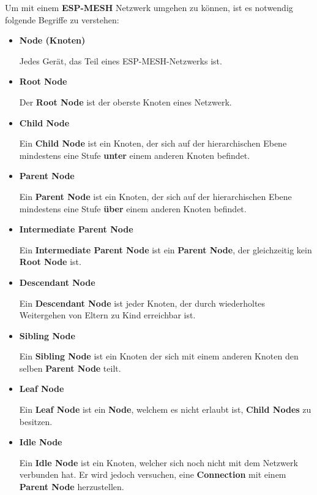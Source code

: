 Um mit einem \textbf{ESP-MESH} Netzwerk umgehen zu können, ist es notwendig folgende Begriffe zu verstehen:
\begin{itemize}
    \item \textbf{Node (Knoten)}
    
    Jedes Gerät, das Teil eines ESP-MESH-Netzwerks ist.
    \item \textbf{Root Node}
    
    Der \textbf{Root Node} ist der oberste Knoten eines Netzwerk.

    \item \textbf{Child Node}
    
    Ein \textbf{Child Node} ist ein Knoten, der sich auf der hierarchischen Ebene mindestens eine Stufe \textbf{unter} einem anderen Knoten befindet.

    \item \textbf{Parent Node}
    
    Ein \textbf{Parent Node} ist ein Knoten, der sich auf der hierarchischen Ebene mindestens eine Stufe \textbf{über} einem anderen Knoten befindet.

    \item \textbf{Intermediate Parent Node}
    
    Ein \textbf{Intermediate Parent Node} ist ein \textbf{Parent Node}, der gleichzeitig kein \textbf{Root Node} ist.

    \item \textbf{Descendant Node}
    
    Ein \textbf{Descendant Node} ist jeder Knoten, der durch wiederholtes Weitergehen von Eltern zu Kind erreichbar ist.

    \item \textbf{Sibling Node}
    
    Ein \textbf{Sibling Node} ist ein Knoten der sich mit einem anderen Knoten den selben \textbf{Parent Node} teilt.

    \item \textbf{Leaf Node}
    
    Ein \textbf{Leaf Node} ist ein \textbf{Node}, welchem es nicht erlaubt ist, \textbf{Child Nodes} zu besitzen.

    \item \textbf{Idle Node}
    
    Ein \textbf{Idle Node} ist ein Knoten, welcher sich noch nicht mit dem Netzwerk verbunden hat. Er wird jedoch versuchen, eine \textbf{Connection} mit einem \textbf{Parent Node} herzustellen.


\end{itemize}
